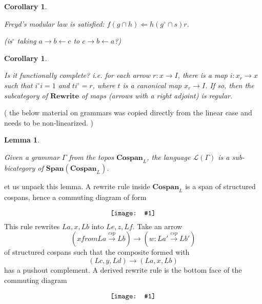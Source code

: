 \documentclass{amsart}
\newcommand{\from}{\colon}
\newcommand{\tocospan}{\xrightarrow{\mathit{csp}}}
\newcommand{\diagram}[1]{\raisebox{-0.5\height}{\texttt{[image: \#1]}}}
\newcommand{\Span}{\mathbf{Span}}
\newcommand{\Cospan}{\mathbf{Cospan}}
\newcommand{\Rewrite}{\mathbf{Rewrite} }
\newcommand{\edit}[1]{\textcolor{editcolour}{(#1)}}
\newenvironment{exposition}[1]{}{}
\newtheorem{lemma}[theorem]{Lemma}
\newtheorem{corollary}[theorem]{Corollary}
\theoremstyle{remark}
\theoremstyle{definition}
\begin{document}
\begin{corollary} \label{thm:bicat-rewr-freyds-modular}

  Freyd's modular law is satisfied:
  $ f (g \cap h) \Leftarrow h ( g^\circ \cap s ) r $.

  \edit{is$ ^\circ $ taking $ a \to b \gets c $ to
    $ c \to b\gets a $?}
  
\end{corollary} 

\begin{corollary}
  \label{thm:bicat-rewr-function-compl}

  Is it functionally complete? i.e. for each arrow
  $ r \from x \to I $, there is a map $ i \from x_r \to x $ such that
  $ i^\circ i = 1 $ and $ t i^\circ = r $, where $ t $ is a canonical
  map $ x_r \to I $. If so, then the subcategory of $ \Rewrite $ of
  maps (arrows with a right adjoint) is regular.
  
\end{corollary}


\edit{ the below material on grammars was copied directly from the
  linear case and needs to be non-linearized. }

\begin{lemma}
  \label{thm:nlr_open-objects-language}

  Given a grammar $ \Gamma $ from the topos $ \Cospan_L $, the
  language $ \mathcal{L}(\Gamma) $ is a sub-bicategory of
  $ \Span ( \Cospan_{L} ) $.
  
\end{lemma}

\begin{exposition}
  
  Let us unpack this lemma.  A rewrite rule inside \( \Cospan_L \) is
  a span of structured cospans, hence a commuting diagram of form
  \[
    \diagram{diag_lr_rewr-struct-cospans}
  \]
  This rule rewrites \( La , x , Lb \)
  into \( Le , z , Lf \).  Take an arrow
  \[
    ( x from La \tocospan Lb ) \to (w \from La' \tocospan Lb')
  \]
  of structured cospans such that the composite formed with
  \[
    ( Lc , y , Ld ) \to ( La , x , Lb )
  \]
  has a pushout complement. A derived rewrite rule is the bottom
  face of the commuting diagram
  \[
    \diagram{diag_lr_-derived-rewrite-rule}
  \]
  
\end{exposition}
\end{document}
